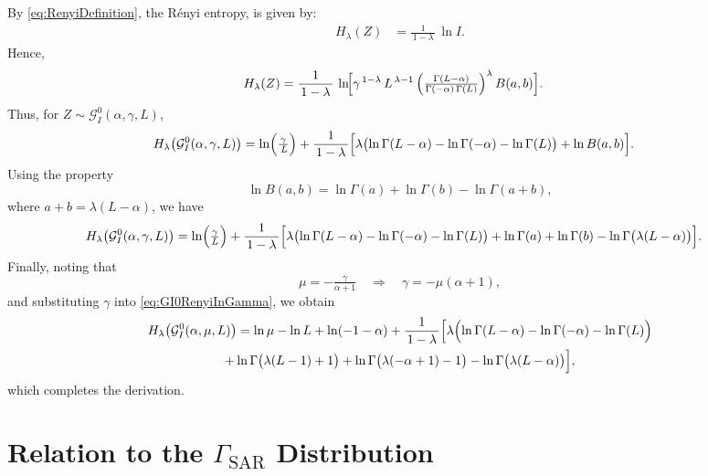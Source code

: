 \documentclass[11pt,]{article}
\begin{document}
\medskip

\noindent By \eqref{eq:RenyiDefinition}, the Rényi entropy, is given by:
\begin{align*}
H_\lambda(Z)
&= \frac{1}{\,1 - \lambda\,} \,\ln I.
\end{align*} Hence, \begin{align*}
H_\lambda(Z) 
&= \frac{1}{\,1 - \lambda\,}
  \,\ln\!\Bigl[
    \gamma^{\,1 - \lambda}\,
    L^{\,\lambda - 1}\,
    \Bigl(\tfrac{\Gamma(L - \alpha)}{\Gamma(-\alpha)\,\Gamma(L)}\Bigr)^\lambda
    \,B(a,b)
  \Bigr].
\end{align*} Thus, for \(Z \sim \mathcal{G}^0_I(\alpha, \gamma, L)\),
\begin{align*}
H_\lambda\bigl(\mathcal{G}^0_I(\alpha, \gamma, L)\bigr)
&= \ln\Bigl(\tfrac{\gamma}{\,L}\Bigr)
  + \frac{1}{\,1 - \lambda\,}
    \Bigl[
      \lambda\bigl(\ln \Gamma(L - \alpha) 
            - \ln \Gamma(-\alpha) 
            - \ln \Gamma(L)\bigr)
      + \ln B(a,b)
    \Bigr].
\end{align*} Using the property \[
\ln B(a,b) 
= \ln \Gamma(a) + \ln \Gamma(b) - \ln \Gamma(a + b),
\] where \(a + b = \lambda(L - \alpha)\), we have \begin{align}
H_\lambda\bigl(\mathcal{G}^0_I( \alpha,\gamma, L)\bigr)
&= \ln\Bigl(\tfrac{\gamma}{L}\Bigr)
 + \frac{1}{\,1 - \lambda\,}
   \Bigl[
     \lambda\bigl(\ln \Gamma(L - \alpha) 
            - \ln \Gamma(-\alpha) 
            - \ln \Gamma(L)\bigr)
     + \ln \Gamma(a)
     + \ln \Gamma(b)
     - \ln \Gamma\bigl(\lambda(L - \alpha)\bigr)
   \Bigr].
\label{eq:GI0RenyiInGamma}
\end{align} Finally, noting that \[
\mu = -\tfrac{\gamma}{\alpha + 1}
\quad\Longrightarrow\quad
\gamma = -\mu(\alpha + 1),
\] and substituting \(\gamma\) into \eqref{eq:GI0RenyiInGamma}, we
obtain \begin{multline}
H_\lambda\bigl(\mathcal{G}^0_I( \alpha,\mu, L)\bigr)
= \ln \mu  -  \ln L + \ln(- 1-\alpha)
+ \frac{1}{\,1 - \lambda\,}
  \Bigl[
    \lambda\Bigl(\ln \Gamma(L - \alpha) 
        - \ln \Gamma(-\alpha) 
        - \ln \Gamma(L)\Bigr)\\
    + \ln \Gamma\bigl(\lambda(L - 1) + 1\bigr)
    + \ln \Gamma\bigl(\lambda(-\alpha + 1) - 1\bigr)
    - \ln \Gamma\bigl(\lambda(L - \alpha)\bigr)
  \Bigr],
\label{eq:RenyiGI0Final}
\end{multline} which completes the derivation.

\section{\texorpdfstring{Relation to the
\texorpdfstring{$\Gamma_{\mathrm{SAR}}$}{Gamma SAR}
Distribution}{Relation to the  Distribution}}\label{relation-to-the-distribution}
\end{document}
